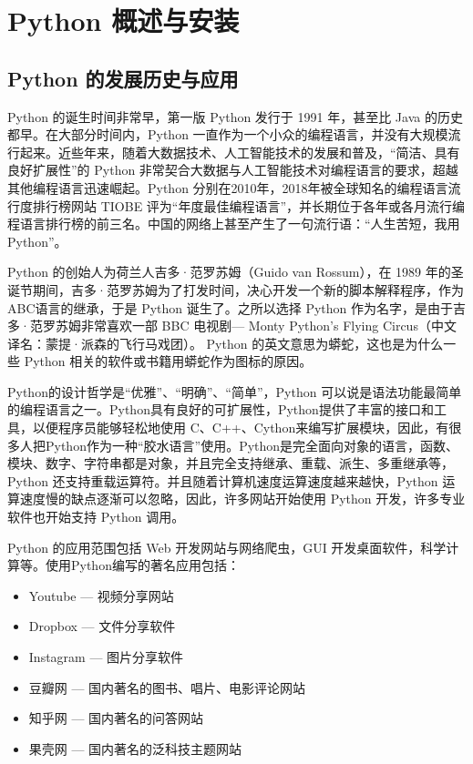 \chapter{Python 概述与安装}
\section{Python 的发展历史与应用}
Python 的诞生时间非常早，第一版 Python 发行于 1991 年，甚至比 Java 的历史都早。在大部分时间内，Python 一直作为一个小众的编程语言，并没有大规模流行起来。近些年来，随着大数据技术、人工智能技术的发展和普及，“简洁、具有良好扩展性”的 Python 非常契合大数据与人工智能技术对编程语言的要求，超越其他编程语言迅速崛起。Python 分别在2010年，2018年被全球知名的编程语言流行度排行榜网站 TIOBE 评为“年度最佳编程语言”，并长期位于各年或各月流行编程语言排行榜的前三名。中国的网络上甚至产生了一句流行语：“人生苦短，我用 Python”。

Python 的创始人为荷兰人吉多·范罗苏姆（Guido van Rossum），在 1989 年的圣诞节期间，吉多·范罗苏姆为了打发时间，决心开发一个新的脚本解释程序，作为 ABC语言的继承，于是 Python 诞生了。之所以选择 Python 作为名字，是由于吉多·范罗苏姆非常喜欢一部 BBC 电视剧--- Monty Python's Flying Circus（中文译名：蒙提·派森的飞行马戏团）。 Python 的英文意思为蟒蛇，这也是为什么一些 Python 相关的软件或书籍用蟒蛇作为图标的原因。

Python的设计哲学是“优雅”、“明确”、“简单”，Python 可以说是语法功能最简单的编程语言之一。Python具有良好的可扩展性，Python提供了丰富的接口和工具，以便程序员能够轻松地使用 C、C++、Cython来编写扩展模块，因此，有很多人把Python作为一种“胶水语言”使用。Python是完全面向对象的语言，函数、模块、数字、字符串都是对象，并且完全支持继承、重载、派生、多重继承等，Python 还支持重载运算符。并且随着计算机速度运算速度越来越快，Python 运算速度慢的缺点逐渐可以忽略，因此，许多网站开始使用 Python 开发，许多专业软件也开始支持 Python 调用。

Python 的应用范围包括 Web 开发网站与网络爬虫，GUI 开发桌面软件，科学计算等。使用Python编写的著名应用包括：

\vspace{5pt}
\begin{itemize}
  \item Youtube --- 视频分享网站

  \item Dropbox --- 文件分享软件

  \item Instagram --- 图片分享软件


  \item 豆瓣网 --- 国内著名的图书、唱片、电影评论网站

  \item 知乎网 --- 国内著名的问答网站

  \item 果壳网 --- 国内著名的泛科技主题网站
\end{itemize}
\vspace{5pt}

